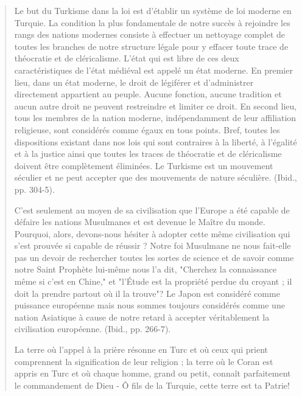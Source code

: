 \begin{quote}
Le but du Turkisme dans la loi est d'établir un système de loi moderne
en Turquie. La condition la plus fondamentale de notre succès à
rejoindre les rangs des nations modernes consiste à effectuer un
nettoyage complet de toutes les branches de notre structure légale pour
y effacer toute trace de théocratie et de cléricalisme. L'état qui est
libre de ces deux caractéristiques de l'état médiéval est appelé un état
moderne. En premier lieu, dans un état moderne, le droit de légiférer et
d'administrer directement appartient au peuple. Aucune fonction, aucune
tradition et aucun autre droit ne peuvent restreindre et limiter ce
droit. En second lieu, tous les membres de la nation moderne,
indépendamment de leur affiliation religieuse, sont considérés comme
égaux en tous points. Bref, toutes les dispositions existant dans nos
lois qui sont contraires à la liberté, à l'égalité et à la justice ainsi
que toutes les traces de théocratie et de cléricalisme doivent être
complètement éliminées. Le Turkisme est un mouvement séculier et ne peut
accepter que des mouvements de nature séculière. (Ibid., pp. 304-5).

C'est seulement au moyen de sa civilisation que l'Europe a été capable
de défaire les nations Musulmanes et est devenue le Maître du monde.
Pourquoi, alors, devons-nous hésiter à adopter cette même civilisation
qui s'est prouvée si capable de réussir ? Notre foi Musulmane ne nous
fait-elle pas un devoir de rechercher toutes les sortes de science et de
savoir comme notre Saint Prophète lui-même nous l'a dit, "Cherchez la
connaissance même si c'est en Chine," et "l'Étude est la propriété
perdue du croyant ; il doit la prendre partout où il la
trouve"? Le Japon est considéré comme puissance européenne
mais nous sommes toujours considérés comme une nation Asiatique à cause
de notre retard à accepter véritablement la civilisation européenne.
(Ibid., pp. 266-7).

La terre où l'appel à la prière résonne en Turc et où ceux qui prient
comprennent la signification de leur religion ; la terre où le Coran est
appris en Turc et où chaque homme, grand ou petit, connaît parfaitement
le commandement de Dieu - Ô fils de la Turquie, cette terre est ta
Patrie!


    
\end{quote}
    
